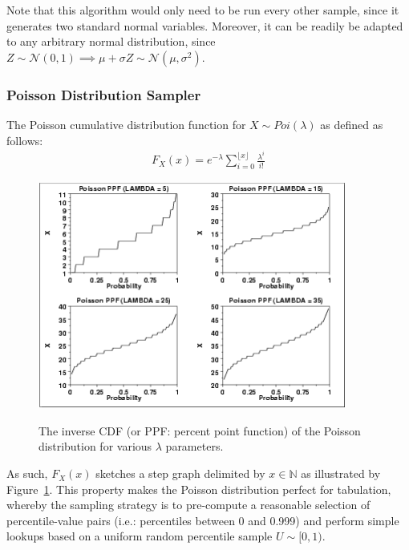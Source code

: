 Note that this algorithm would only need to be run every other sample, since it generates two standard normal
variables. Moreover, it can be readily be adapted to any arbitrary normal distribution, since $Z \sim \mathcal{N}(0,
1) \implies \mu + \sigma Z \sim \mathcal{N}(\mu, \sigma^2)$.

\subsubsection{Poisson Distribution Sampler}\label{subsubsection:poisson_distribution_sampler}

The Poisson cumulative distribution function for $X \sim Poi(\lambda)$ as defined as follows:
\begin{align*}
    F_X(x) = e^{-\lambda} \sum_{i=0}^{\lfloor x \rfloor} \frac{\lambda^i}{i!}
\end{align*}

\begin{figure}[!h]
    \includegraphics[width=0.9\textwidth]{images/chapter_3_design/poisson_percent_point_function}
    \centering~\caption{The inverse CDF (or PPF: percent point function) of the Poisson distribution for various
        $\lambda$ parameters\cite{engineering_statistics_handbook_poisson_distribution}.}
    \label{fig:chapter_3_design-poisson_percent_point_function}
\end{figure}

As such, $F_X(x)$ sketches a step graph delimited by $x \in \mathbb{N}$ as illustrated by
Figure~\ref{fig:chapter_3_design-poisson_percent_point_function}. This property makes the Poisson distribution
perfect for tabulation, whereby the sampling strategy is to pre-compute a reasonable selection of percentile-value
pairs (i.e.: percentiles between 0 and 0.999) and perform simple lookups based on a uniform random percentile sample
$U \sim [0, 1)$.

